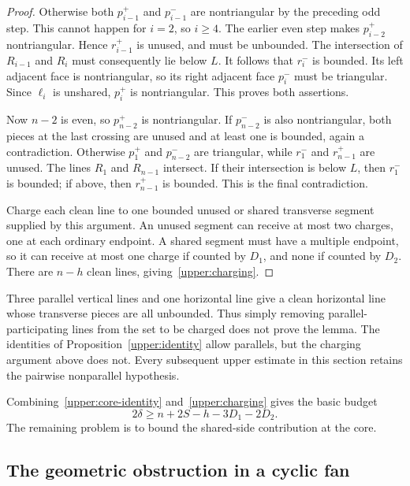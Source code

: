 \begin{proof}
Otherwise both $p_{i-1}^+$ and $p_{i-1}^-$ are nontriangular by the preceding odd step. This cannot happen for $i=2$, so $i\ge4$. The earlier even step makes $p_{i-2}^+$ nontriangular. Hence $r_{i-1}^+$ is unused, and must be unbounded. The intersection of $R_{i-1}$ and $R_i$ must consequently lie below $L$. It follows that $r_i^-$ is bounded. Its left adjacent face is nontriangular, so its right adjacent face $p_i^-$ must be triangular. Since $\ell_i$ is unshared, $p_i^+$ is nontriangular. This proves both assertions.

Now $n-2$ is even, so $p_{n-2}^+$ is nontriangular. If $p_{n-2}^-$ is also nontriangular, both pieces at the last crossing are unused and at least one is bounded, again a contradiction. Otherwise $p_1^+$ and $p_{n-2}^-$ are triangular, while $r_1^-$ and $r_{n-1}^+$ are unused. The lines $R_1$ and $R_{n-1}$ intersect. If their intersection is below $L$, then $r_1^-$ is bounded; if above, then $r_{n-1}^+$ is bounded. This is the final contradiction.

Charge each clean line to one bounded unused or shared transverse segment supplied by this argument. An unused segment can receive at most two charges, one at each ordinary endpoint. A shared segment must have a multiple endpoint, so it can receive at most one charge if counted by $D_1$, and none if counted by $D_2$. There are $n-h$ clean lines, giving~\eqref{upper:charging}.
\end{proof}

\begin{remark}
Three parallel vertical lines and one horizontal line give a clean horizontal line whose transverse pieces are all unbounded. Thus simply removing parallel-participating lines from the set to be charged does not prove the lemma. The identities of Proposition~\ref{upper:identity} allow parallels, but the charging argument above does not. Every subsequent upper estimate in this section retains the pairwise nonparallel hypothesis.
\end{remark}

Combining~\eqref{upper:core-identity} and~\eqref{upper:charging} gives the basic budget
\begin{equation}
 2\delta\ge n+2S-h-3D_1-2D_2.
 \label{upper:basic-budget}
\end{equation}
The remaining problem is to bound the shared-side contribution at the core.

\subsection{The geometric obstruction in a cyclic fan}

